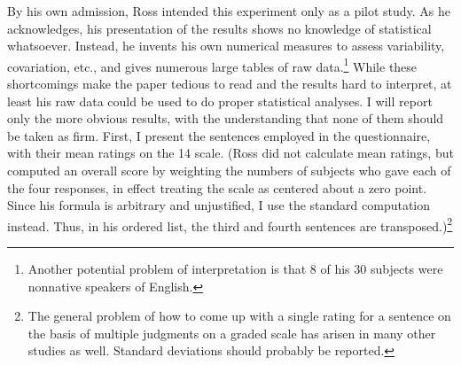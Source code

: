 By his own admission, Ross intended this experiment only as a pilot study. As he acknowledges, his presentation of the results shows no knowledge of statistical  whatsoever. Instead, he invents his own numerical measures to assess variability, covariation, etc., and gives numerous large tables of raw data.\footnote{Another potential problem of interpretation is that 8 of his 30 subjects were nonnative speakers of English.}
 While these shortcomings make the paper tedious to read and the results hard to interpret, at least his raw data could be used to do proper statistical analyses. I will report only the more obvious results, with the understanding that none of them should be taken as firm. First, I present the sentences employed in the questionnaire, with their mean ratings on the 1\textendash{}4 scale. (Ross did not calculate mean
ratings, but computed an overall score by weighting the numbers of subjects who gave each of the four responses, in effect treating the scale as centered about a zero point. Since his formula is arbitrary and unjustified, I use the standard computation instead. Thus, in his ordered list, the third and fourth sentences are transposed.)\footnote{The general problem of how to come up with a single rating for a sentence on the basis of multiple judgments on a graded scale has arisen in many other studies as well. Standard deviations should probably be reported.}\bigskip


%
%


